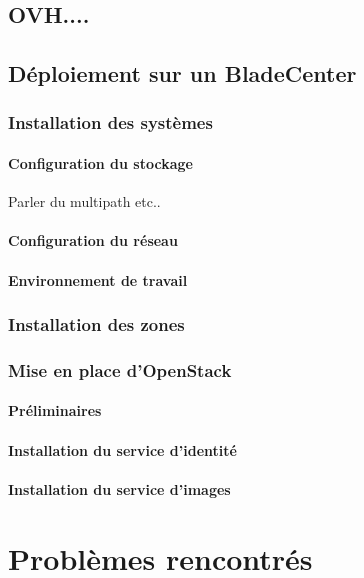 \documentclass{report}
\begin{document}
\section{OVH....}

\section{Déploiement sur un BladeCenter}
\subsection{Installation des systèmes}

\subsubsection{Configuration du stockage}
Parler du multipath etc..

\subsubsection{Configuration du réseau}

\subsubsection{Environnement de travail}

\subsection{Installation des zones}

\subsection{Mise en place d'OpenStack}
\subsubsection{Préliminaires}

\subsubsection{Installation du service d'identité}

\subsubsection{Installation du service d'images}

\chapter{Problèmes rencontrés}
\end{document}
